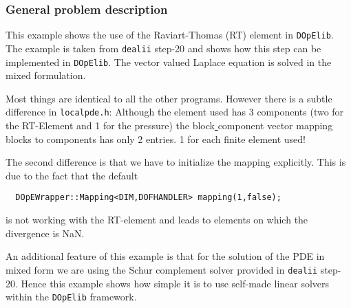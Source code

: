 \subsubsection{General problem description}
This example shows the use of the Raviart-Thomas (RT) element in \texttt{DOpElib}. The example 
is taken from \texttt{dealii} step-20 and shows how this step can be implemented in \texttt{DOpElib}. The vector valued Laplace equation is solved in the mixed formulation.

Most things are identical to all the other programs. However there is a subtle difference in 
\texttt{localpde.h}: Although the element used has 3 components (two for the RT-Element and 1 for the pressure)
the block\underline{ }component vector mapping blocks to components has only 2 entries. 1 for each finite element used!

The second difference is that we have to initialize the mapping explicitly. This is due to the fact that the 
default 
\begin{verbatim}
  DOpEWrapper::Mapping<DIM,DOFHANDLER> mapping(1,false);
\end{verbatim}
is not working with the RT-element and leads to elements on which the divergence is NaN.

An additional feature of this example is that for the solution of the PDE in mixed form we are using the 
Schur complement solver provided in \texttt{dealii} step-20. Hence this example shows how simple it is to 
use self-made linear solvers within the \texttt{DOpElib} framework.